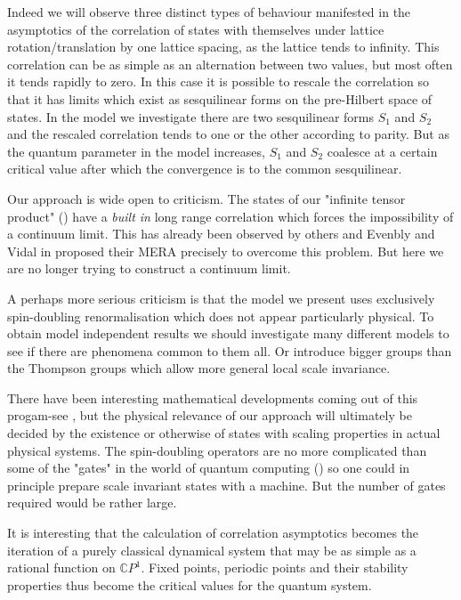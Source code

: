 \documentclass[11pt]{amsart}
\newcommand{\1}{\mathcal I}
\newcommand{\5}{\vskip 5pt}
\begin{document}
Indeed we will observe three distinct types of behaviour manifested in the asymptotics of the correlation of states with
themselves under lattice rotation/translation by one lattice spacing, as the lattice tends to infinity. This correlation can be 
as simple as an alternation between two values, but most often it  tends rapidly to zero. In this case it is possible to 
rescale the correlation so that it has limits which exist as sesquilinear forms on the pre-Hilbert space of states. 
In the model we investigate there are two sesquilinear forms $S_1$ and $S_2$ and the rescaled correlation tends
to one or the other according to parity. But as the quantum parameter in the model increases, $S_1$ and $S_2$ 
coalesce at a certain critical value after which the convergence is to the common sesquilinear. 

Our approach is wide open to criticism. The states of our "infinite tensor product" (\cite{vNdirect}) have a {\em built in}
long range correlation which forces the impossibility of a continuum limit. This has already been observed by others
and Evenbly and Vidal in \cite{EV} proposed their MERA precisely to overcome this problem. But here we are no longer
trying to construct a continuum limit. 

A perhaps more serious criticism is that the model we present uses exclusively spin-doubling renormalisation which
does not appear particularly physical. To obtain model independent results we should investigate many different models
to see if there are phenomena common to them all. Or introduce bigger groups than the Thompson groups which 
allow more general local scale invariance.

  There have been interesting mathematical developments coming out of this progam-see \cite{jo4}, but the physical relevance of our approach will ultimately be decided by the existence or otherwise of
states with scaling properties in actual physical systems. The spin-doubling operators are no more 
complicated than some of the "gates" in the world of quantum computing (\cite{NC}) so one could in principle
prepare scale invariant states with a machine. But the number of gates required would be rather large. 

It is interesting that the calculation of correlation asymptotics becomes the iteration of a purely classical
dynamical system that may be as simple as a rational function on $\mathbb C P ^1$.  Fixed points, periodic points
and their stability properties thus become the critical values for the quantum system.
\end{document}
